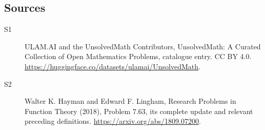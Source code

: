 \documentclass[11pt]{article}
\begin{document}
\subsection{Sources}
\begin{description}
\item[\hypertarget{source:statement:1}{S1}] ULAM.AI and the UnsolvedMath Contributors, UnsolvedMath: A Curated Collection of Open Mathematics Problems, catalogue entry. CC BY 4.0. \url{https://huggingface.co/datasets/ulamai/UnsolvedMath}.
\item[\hypertarget{source:statement:2}{S2}] Walter K. Hayman and Edward F. Lingham, Research Problems in Function Theory (2018), Problem 7.63, its complete update and relevant preceding definitions. \url{https://arxiv.org/abs/1809.07200}.
\end{description}
\label{end:statement}
\end{document}
